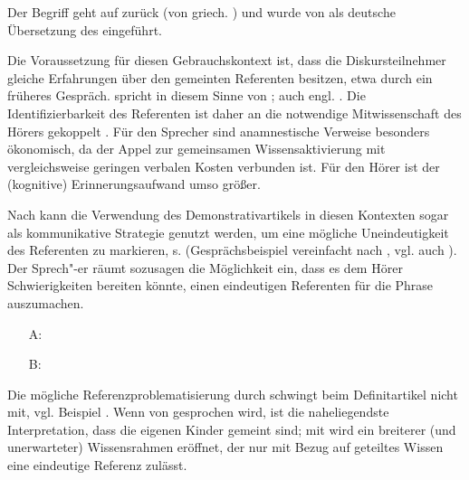 \begin{exe}
	\ex \label{ex:anamn}   
\end{exe}

Der Begriff  geht auf \textcite{Buhler1934} zurück (von griech.  ) und wurde von \textcite{Himmelmann1997} als deutsche Übersetzung des  \parencite{Himmelmann1996,Diessel1999}  eingeführt.

Die Voraussetzung für diesen Gebrauchskontext ist, dass die Diskursteilnehmer gleiche Erfahrungen über den gemeinten Referenten besitzen, etwa durch ein früheres Gespräch. \textcite[44]{Bisle-Muller1991} spricht in diesem Sinne von ; auch engl.  \parencite[106]{Diessel1999}. Die Identifizierbarkeit des Referenten ist daher an die notwendige Mitwissenschaft des Hörers gekoppelt \parencite[72]{Szczepaniak2011a}. Für  den Sprecher sind anamnestische Verweise besonders ökonomisch, da der Appel zur gemeinsamen Wissensaktivierung mit vergleichsweise geringen verbalen Kosten verbunden ist. Für den Hörer ist der (kognitive) Erinnerungsaufwand umso größer.

Nach \textcite[79-80]{Bisle-Muller1991} kann die Verwendung des Demonstrativartikels in diesen Kontexten sogar als kommunikative Strategie genutzt werden, um eine mögliche Uneindeutigkeit des Referenten zu markieren, s.  (Gesprächsbeispiel vereinfacht nach \cite[637]{Auer1984}, vgl. auch \cite[58]{Himmelmann1997}). Der Sprech"-er räumt sozusagen die Möglichkeit ein, dass es dem Hörer Schwierigkeiten bereiten könnte, einen eindeutigen Referenten für die Phrase  auszumachen. 

\begin{exe}
	\ex \label{ex:auer} 
	\begin{itemize}
		\item[A:]  
		\item[B:]  
	\end{itemize}
\end{exe}

Die mögliche Referenzproblematisierung durch  schwingt beim Definitartikel nicht mit, vgl. Beispiel  \parencites()()[][80]{Bisle-Muller1991}[][70]{Himmelmann1997}. Wenn von  gesprochen wird, ist die naheliegendste Interpretation, dass die eigenen Kinder gemeint sind; mit  wird ein breiterer (und unerwarteter) Wissensrahmen eröffnet, der nur mit Bezug auf geteiltes Wissen eine eindeutige Referenz zulässt.    


